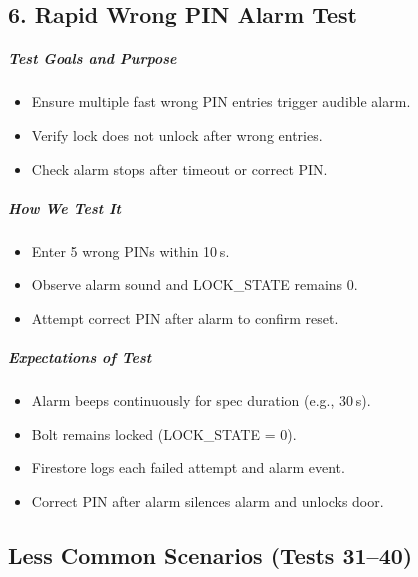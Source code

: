 \subsection*{6. Rapid Wrong PIN Alarm Test}
\subparagraph{Test Goals and Purpose}
\begin{itemize}
    \item Ensure multiple fast wrong PIN entries trigger audible alarm.
    \item Verify lock does not unlock after wrong entries.
    \item Check alarm stops after timeout or correct PIN.
\end{itemize}
\subparagraph{How We Test It}
\begin{itemize}
    \item Enter 5 wrong PINs within 10 s.
    \item Observe alarm sound and LOCK\_STATE remains 0.
    \item Attempt correct PIN after alarm to confirm reset.
\end{itemize}
\subparagraph{Expectations of Test}
\begin{itemize}
    \item Alarm beeps continuously for spec duration (e.g., 30 s).
    \item Bolt remains locked (LOCK\_STATE = 0).
    \item Firestore logs each failed attempt and alarm event.
    \item Correct PIN after alarm silences alarm and unlocks door.
\end{itemize}


























\newpage
\subsection*{Less Common Scenarios (Tests 31–40)}


